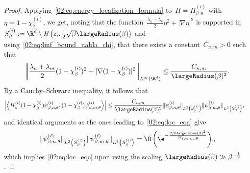 \begin{proof}
        Applying~\eqref{02:eq:energy_localization_formula} to~$H = H_{\beta,\theta}^{(i)}$ with~$\eta =1-\chi_\beta^{(i)}$, we get, noting that the function~$\frac{\lambda_u+\lambda_v}2\eta^2+|\nabla\eta|^2$ is supported in~$S^{(i)}_\beta:=\R^d\setminus B\left(z_i,\frac12\sqrt\beta\largeRadius(\beta)\right)$ and using~\eqref{02:eq:linf_bound_nabla_chi}, that there exists a constant~$C_{n,m}>0$ such that
        \[\left\|\frac{\lambda_n+\lambda_m}{2}(1-\chi_\beta^{(i)})^2+|\nabla(1-\chi_\beta^{(i)})|^2\right\|_{L^\infty(\R^d)}\leq \frac{C_{n,m}}{\largeRadius(\beta)^2}.\]
        By a Cauchy--Schwarz inequality, it follows that
        \begin{equation}
            \begin{aligned}
                \left|\left\langle H_\beta^{(i)}(1-\chi_\beta^{(i)})\psi_{\beta,n,\theta}^{(i)},(1-\chi_\beta^{(i)})\psi_{\beta,m,\theta}^{(i)}\right\rangle \right| &\leq \frac{C_{n,m}}{\largeRadius(\beta)^2}\|\psi^{(i)}_{\beta,n,\theta}\|_{L^2\left(S^{(i)}_\beta\right)}\|\psi^{(i)}_{\beta,m,\theta}\|_{L^2\left(S^{(i)}_\beta\right)},
            \end{aligned}
        \end{equation}
        and identical arguments as the ones leading to~\eqref{02:eq:loc_eqa} give
        \[\|\psi^{(i)}_{\beta,n,\theta}\|_{L^2\left(S^{(i)}_\beta\right)}\|\psi^{(i)}_{\beta,m,\theta}\|_{L^2\left(S^{(i)}_\beta\right)} = \O\left(\e^{-\frac{2\beta\largeRadius(\beta)^2}{M_{i,n,m,\theta}}}\right),\]
        which implies~\eqref{02:eq:loc_eqc} upon using the scaling $\largeRadius(\beta)\gg \beta^{-\frac12}$.
    \end{proof}

